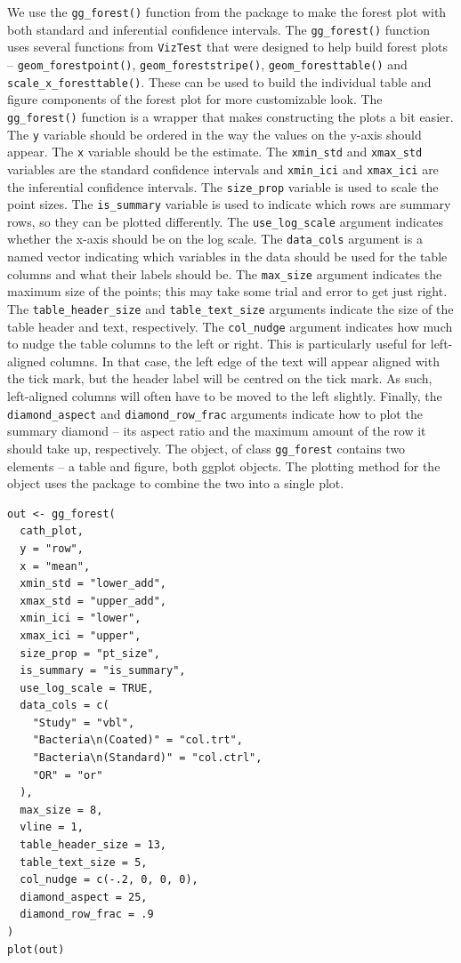 We use the \texttt{gg\_forest()} function from the  package to make the forest plot with both standard and inferential confidence intervals. The \texttt{gg\_forest()} function uses several functions from \texttt{VizTest} that were designed to help build forest plots -- \texttt{geom\_forestpoint()}, \texttt{geom\_foreststripe()}, \texttt{geom\_foresttable()} and \texttt{scale\_x\_foresttable()}. These can be used to build the individual table and figure components of the forest plot for more customizable look. The \texttt{gg\_forest()} function is a wrapper that makes constructing the plots a bit easier. The \texttt{y} variable should be ordered in the way the values on the y-axis should appear. The \texttt{x} variable should be the estimate. The \texttt{xmin\_std} and \texttt{xmax\_std} variables are the standard confidence intervals and \texttt{xmin\_ici} and \texttt{xmax\_ici} are the inferential confidence intervals. The \texttt{size\_prop} variable is used to scale the point sizes. The \texttt{is\_summary} variable is used to indicate which rows are summary rows, so they can be plotted differently. The \texttt{use\_log\_scale} argument indicates whether the x-axis should be on the log scale. The \texttt{data\_cols} argument is a named vector indicating which variables in the data should be used for the table columns and what their labels should be. The \texttt{max\_size} argument indicates the maximum size of the points; this may take some trial and error to get just right. The \texttt{table\_header\_size} and \texttt{table\_text\_size} arguments indicate the size of the table header and text, respectively. The \texttt{col\_nudge} argument indicates how much to nudge the table columns to the left or right. This is particularly useful for left-aligned columns. In that case, the left edge of the text will appear aligned with the tick mark, but the header label will be centred on the tick mark. As such, left-aligned columns will often have to be moved to the left slightly. Finally, the \texttt{diamond\_aspect} and \texttt{diamond\_row\_frac} arguments indicate how to plot the summary diamond -- its aspect ratio and the maximum amount of the row it should take up, respectively. The object, of class \texttt{gg\_forest} contains two elements -- a table and figure, both ggplot objects. The plotting method for the object uses the  package to combine the two into a single plot.

\begin{verbatim}
out <- gg_forest(
  cath_plot,
  y = "row",
  x = "mean",
  xmin_std = "lower_add",
  xmax_std = "upper_add",
  xmin_ici = "lower",
  xmax_ici = "upper",
  size_prop = "pt_size",
  is_summary = "is_summary",
  use_log_scale = TRUE,
  data_cols = c(
    "Study" = "vbl",
    "Bacteria\n(Coated)" = "col.trt",
    "Bacteria\n(Standard)" = "col.ctrl",
    "OR" = "or"
  ),
  max_size = 8,
  vline = 1,
  table_header_size = 13,
  table_text_size = 5,
  col_nudge = c(-.2, 0, 0, 0),
  diamond_aspect = 25,
  diamond_row_frac = .9
)
plot(out)
\end{verbatim}


